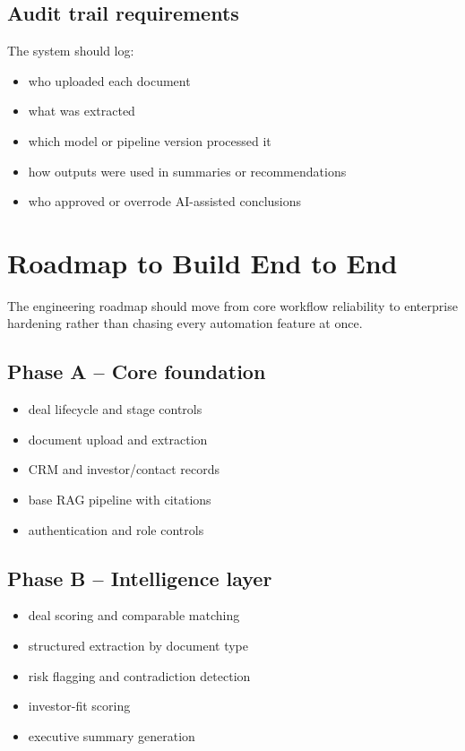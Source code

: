 \documentclass[11pt]{article}
\begin{document}
\subsection{Audit trail requirements}

The system should log:

\begin{itemize}
\item who uploaded each document
\item what was extracted
\item which model or pipeline version processed it
\item how outputs were used in summaries or recommendations
\item who approved or overrode AI-assisted conclusions
\end{itemize}

\section{Roadmap to Build End to End}

The engineering roadmap should move from core workflow reliability to enterprise hardening rather than chasing every automation feature at once.

\subsection{Phase A -- Core foundation}

\begin{itemize}
\item deal lifecycle and stage controls
\item document upload and extraction
\item CRM and investor/contact records
\item base RAG pipeline with citations
\item authentication and role controls
\end{itemize}

\subsection{Phase B -- Intelligence layer}

\begin{itemize}
\item deal scoring and comparable matching
\item structured extraction by document type
\item risk flagging and contradiction detection
\item investor-fit scoring
\item executive summary generation
\end{itemize}
\end{document}
